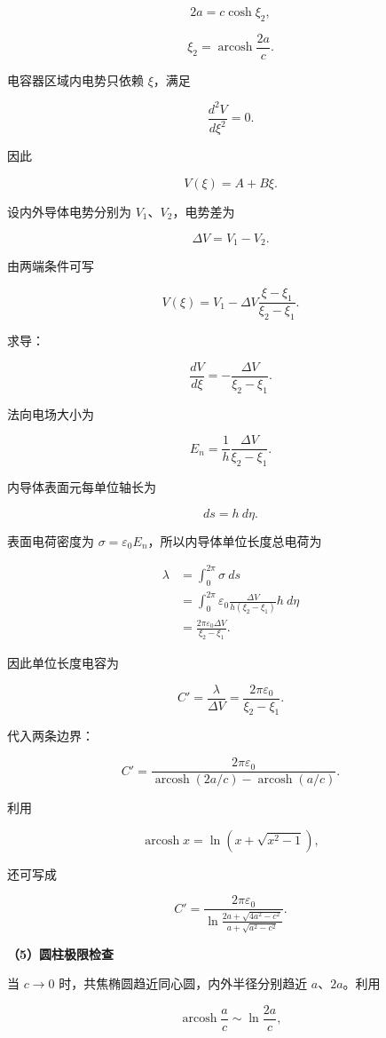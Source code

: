 \documentclass[12pt,a4paper,UTF8]{ctexart}
\begin{document}
\[2a=c\cosh\xi_2,\]

\[\boxed{\xi_2=\operatorname{arcosh}\frac{2a}{c}}.\]

电容器区域内电势只依赖 \(\xi\)，满足

\[\frac{d^2V}{d\xi^2}=0.\]

因此

\[V(\xi)=A+B\xi.\]

设内外导体电势分别为 \(V_1\)、\(V_2\)，电势差为

\[\Delta V=V_1-V_2.\]

由两端条件可写

\[V(\xi)=V_1-\Delta V\frac{\xi-\xi_1}{\xi_2-\xi_1}.\]

求导：

\[\frac{dV}{d\xi}=-\frac{\Delta V}{\xi_2-\xi_1}.\]

法向电场大小为

\[E_n=\frac1h\frac{\Delta V}{\xi_2-\xi_1}.\]

内导体表面元每单位轴长为

\[ds=h\ d\eta.\]

表面电荷密度为 \(\sigma=\varepsilon_0E_n\)，所以内导体单位长度总电荷为

\[\begin{aligned}
\lambda
&=\int_0^{2\pi}\sigma\ ds\\
&=\int_0^{2\pi}
\varepsilon_0\frac{\Delta V}{h(\xi_2-\xi_1)}h\ d\eta\\
&=\frac{2\pi\varepsilon_0\Delta V}{\xi_2-\xi_1}.
\end{aligned}\]

因此单位长度电容为

\[\boxed{
C'=\frac\lambda{\Delta V}
=\frac{2\pi\varepsilon_0}{\xi_2-\xi_1}
}.\]

代入两条边界：

\[\boxed{
C'=\frac{2\pi\varepsilon_0}
{\operatorname{arcosh}(2a/c)-\operatorname{arcosh}(a/c)}
}.\]

利用

\[\operatorname{arcosh}x=\ln\left(x+\sqrt{x^2-1}\right),\]

还可写成

\[\boxed{
C'=\frac{2\pi\varepsilon_0}
{\displaystyle
\ln\frac{2a+\sqrt{4a^2-c^2}}
{a+\sqrt{a^2-c^2}}}
}.\]

\textbf{（5）圆柱极限检查}

当 \(c\to0\) 时，共焦椭圆趋近同心圆，内外半径分别趋近
\(a\)、\(2a\)。利用

\[\operatorname{arcosh}\frac ac\sim\ln\frac{2a}{c},\]
\end{document}
